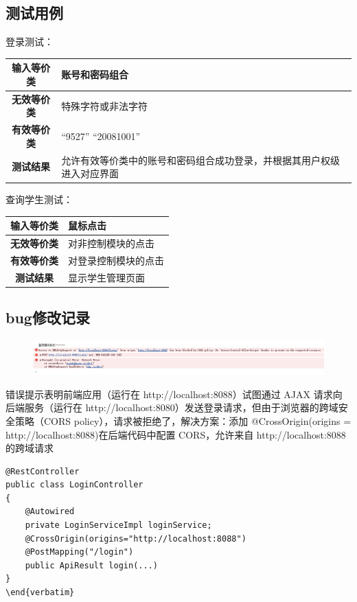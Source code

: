 \documentclass{article}
\begin{document}
\subsection{测试用例}
登录测试：

\begin{centering}
\begin{longtable}{|c|m{11cm}<{\centering}|} \hline
\textbf{输入等价类} & 账号和密码组合 \\ \hline
\textbf{无效等价类} & 特殊字符或非法字符 \\ \hline
\textbf{有效等价类} & “9527” “20081001”\\ \hline
\textbf{测试结果} & 允许有效等价类中的账号和密码组合成功登录，并根据其用户权级进入对应界面 \\ \hline
\end{longtable}
\end{centering}

查询学生测试：

\begin{centering}
\begin{longtable}{|c|m{11cm}<{\centering}|} \hline
\textbf{输入等价类} & 鼠标点击 \\ \hline
\textbf{无效等价类} & 对非控制模块的点击 \\ \hline
\textbf{有效等价类} & 对登录控制模块的点击 \\ \hline
\textbf{测试结果} & 显示学生管理页面 \\ \hline
\end{longtable}
\end{centering}

\subsection{bug修改记录}

\begin{figure}[H]
    \centering
    \includegraphics[width=0.9\linewidth]{error.png}
\end{figure}
错误提示表明前端应用（运行在 http://localhost:8088）试图通过 AJAX 请求向后端服务（运行在 http://localhost:8080）发送登录请求，但由于浏览器的跨域安全策略（CORS policy），请求被拒绝了，解决方案：添加 @CrossOrigin(origins = http://localhost:8088)在后端代码中配置 CORS，允许来自 http://localhost:8088 的跨域请求
\begin{lstlisting}
@RestController
public class LoginController
{
    @Autowired
    private LoginServiceImpl loginService;
    @CrossOrigin(origins="http://localhost:8088")
    @PostMapping("/login")
    public ApiResult login(...)
}
\end{verbatim}
\end{lstlisting}
\end{document}
